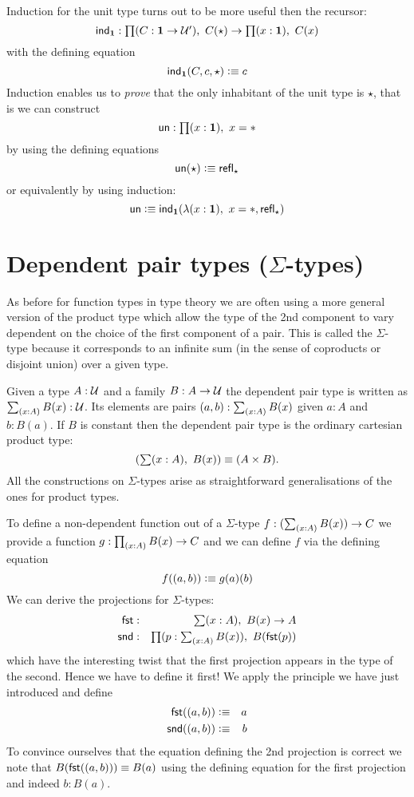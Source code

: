 Induction for the unit type turns out to be more useful then the
recursor: 
\[ \ind{\unit} : \prd{C:\unit \to \UU'} C(\star) \to \prd{x:\unit}C(x)\]
with the defining equation
\[ \mathsf{ind}_{\mathbf{1}}(C,c,\star) \vcentcolon\equiv c \]
Induction enables us to \emph{prove} that the only inhabitant of the
unit type is $\star$, that is we can construct
\[\un : \prd{x:\unit} x = * \]
by using the defining equations
\[\mathsf{un}(\star) \vcentcolon\equiv \mathsf{refl}_{\star} \]
or equivalently by using induction:
\[\un \defeq \ind{\unit}(\lam{x:\unit} x = *,\refl{\star}) \]

\section{Dependent pair types (\texorpdfstring{$\Sigma$}{Σ}-types)}
\label{sec:sigma-types}

As before for function types in type theory we are often using a
more general version of the product type which allow the type of
the 2nd component to vary dependent on the choice of the first
component of a pair. This is called the $\Sigma$-type because it
corresponds to an infinite sum (in the sense of coproducts or
disjoint union) over a given type.

Given a type $A:\mathcal{U}$ and a family $B : A \to \mathcal{U}$ the dependent
pair type is written as $\sm{x:A} B(x) : \UU$. Its elements are
pairs $\tup{a}{b} : \sm{x:A} B(x)$ given $a:A$ and $b:B(a)$.
If $B$ is constant then the dependent pair type is the
ordinary cartesian product type:
\[ (\sm{x:A} B(x)) \jdeq (A \times B).\]
All the constructions on $\Sigma$-types arise as straightforward generalisations of the ones for product types.

To define a non-dependent function out of a $\Sigma$-type
$f : (\sm{x:A} B(x)) \to C$ we provide a function 
$g : \prd{x:A} B(x) \to C$ and we can define $f$ via the defining
equation
\[ f(( a,b)) \vcentcolon\equiv g(a)(b) \]
We can derive the projections for $\Sigma$-types:
\begin{eqnarray*}
  \fst & : & \sm{x : A}B(x) \to A \\
  \snd & : & \prd{p:\sm{x : A}B(x)}B(\fst(p))
\end{eqnarray*}
which have the interesting twist that the first projection appears
in the type of the second. Hence we have to define it first!
We apply the principle we have just introduced and define
\begin{eqnarray*}
  \mathsf{fst}(( a,b)) & \vcentcolon\equiv & a \\
  \mathsf{snd}(( a,b)) & \vcentcolon\equiv & b
\end{eqnarray*}
To convince ourselves that the equation defining the 2nd
projection is correct we note that $B (\mathsf{fst}(( a,b))) \equiv
B(a)$ using the defining equation for the first projection and
indeed $b : B(a)$. 

